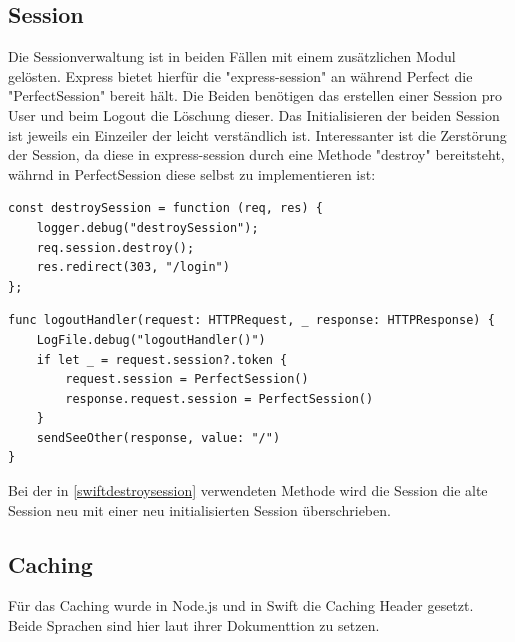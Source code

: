 \subsection{Session}
Die Sessionverwaltung ist in beiden Fällen mit einem zusätzlichen Modul gelösten. Express bietet hierfür die "express-session" an während Perfect die "PerfectSession" bereit hält. Die Beiden benötigen das erstellen einer Session pro User und beim Logout die Löschung dieser. Das Initialisieren der beiden Session ist jeweils ein Einzeiler der leicht verständlich ist. Interessanter ist die Zerstörung der Session, da diese in express-session durch eine Methode "destroy" bereitsteht, währnd in PerfectSession diese selbst zu implementieren ist:

\begin{lstlisting}
const destroySession = function (req, res) {
    logger.debug("destroySession");
    req.session.destroy();
    res.redirect(303, "/login")
};
\end{lstlisting}


\begin{lstlisting}
func logoutHandler(request: HTTPRequest, _ response: HTTPResponse) {
    LogFile.debug("logoutHandler()")
    if let _ = request.session?.token {
        request.session = PerfectSession()
        response.request.session = PerfectSession()
    }
    sendSeeOther(response, value: "/")
}
\end{lstlisting}

Bei der in \ref{swiftdestroysession} verwendeten Methode wird die Session die alte Session neu mit einer neu initialisierten Session überschrieben.

\subsection{Caching}
Für das Caching wurde in Node.js und in Swift die Caching Header gesetzt. Beide Sprachen sind hier laut ihrer Dokumenttion zu setzen.

